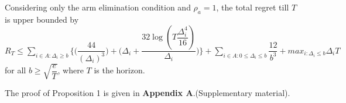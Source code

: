 


\begin{proposition}
Considering only the arm elimination condition and $\rho_{a}=1$, the total regret till $T$ is upper bounded by $R_{T}\leq \sum_{i\in A:\Delta_{i}\geq b}\bigg \lbrace \bigg(\dfrac{44}{(\Delta_{i})^{3}}\bigg) + \bigg(\Delta_{i}+\dfrac{32\log{(T\dfrac{\Delta_{i}^{4}}{16})}}{\Delta_{i}}\bigg)\bigg\rbrace + \sum_{i\in A:0\leq\Delta_{i}\leq b}\dfrac{12}{b^{3}} + max_{i:\Delta_{i}\leq b}\Delta_{i}T$ for all $b\geq\sqrt{\dfrac{e}{T}}$, where $T$ is the horizon.
\end{proposition}

	The proof of Proposition 1 is given in \textbf{Appendix A}.(Supplementary material).

